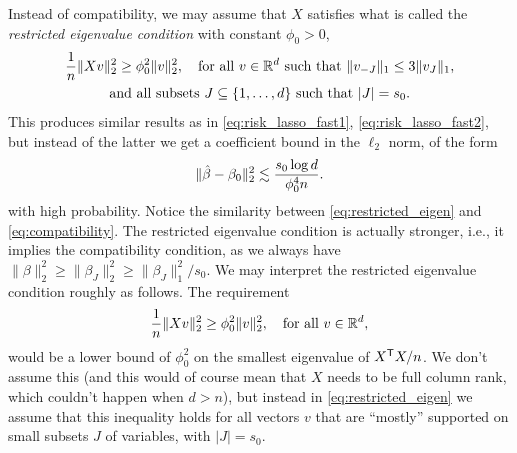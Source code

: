 \documentclass{article}
\begin{document}
Instead of compatibility, we may assume that $X$ satisfies what is called the
\emph{restricted eigenvalue condition} with constant $\phi_0>0$, 
\begin{equation}
\begin{gathered}
\label{eq:restricted_eigen}
\frac{1}{n}\|Xv\|_2^2 \geq \phi_0^2 \|v\|_2^2, \quad
\text{for all $v \in \mathbb{R}^d$ such that $\|v_{-J}\|_1 \leq 3 \|v_{J}\|_1$}, \\   
\text{and all subsets $J \subseteq \{1,\dots,d\}$ such that $|J|=s_0$}.   
\end{gathered}
\end{equation}  
This produces similar results as in \eqref{eq:risk_lasso_fast1},
\eqref{eq:risk_lasso_fast2}, but instead of the latter we get a coefficient
bound in the $\ell_2$ norm, of the form
\[
\|\hat{\beta}-\beta_0\|_2^2 \lesssim \frac{s_0 \log d}{\phi_0^4 n}. 
\]
with high probability. Notice the similarity between \eqref{eq:restricted_eigen} 
and \eqref{eq:compatibility}. The restricted eigenvalue condition is actually
stronger, i.e., it implies the compatibility condition, as we always have
$\|\beta\|_2^2 \geq \|\beta_J\|_2^2 \geq \|\beta_J \|_1^2/s_0$. We may interpret
the restricted eigenvalue condition roughly as follows. The requirement
\[
\frac{1}{n} \|Xv\|_2^2 \geq \phi_0^2 \|v\|_2^2, \quad \text{for all $v \in
  \mathbb{R}^d$},
\]
would be a lower bound of $\phi_0^2$ on the smallest eigenvalue of $X^{\mathsf{T}} X/n$.
We don't assume this (and this would of course mean that $X$ needs to be full
column rank, which couldn't happen when $d>n$), but instead in
\eqref{eq:restricted_eigen} we assume that this inequality holds for all vectors
$v$ that are ``mostly'' supported on small subsets $J$ of variables, with
$|J|=s_0$.    



\end{document}

